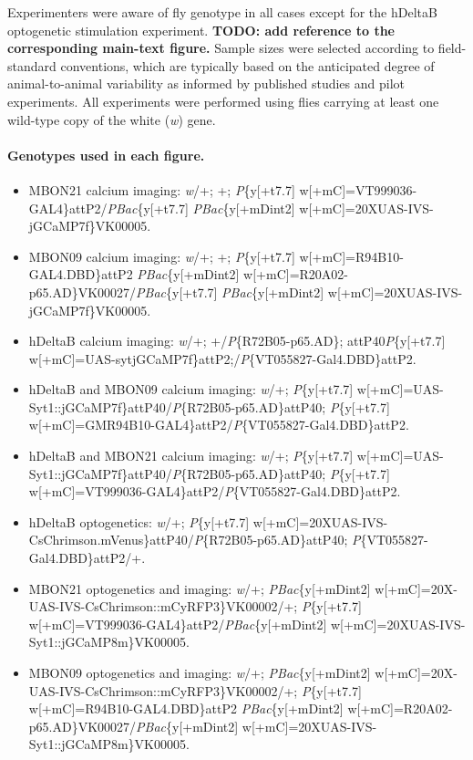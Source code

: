 Experimenters were aware of fly genotype in all cases except for the hDeltaB optogenetic stimulation experiment. \textbf{TODO: add reference to the corresponding main-text figure.} Sample sizes were selected according to field-standard conventions, which are typically based on the anticipated degree of animal-to-animal variability as informed by published studies and pilot experiments. All experiments were performed using flies carrying at least one wild-type copy of the white (\textit{w}) gene.

\paragraph{Genotypes used in each figure.}

{\raggedright
\begin{itemize}
    \item MBON21 calcium imaging: \textit{w}/+; +; \textit{P}\{y[+t7.7] w[+mC]=VT999036-GAL4\}attP2/\textit{PBac}\{y[+t7.7] \textit{PBac}\{y[+mDint2] w[+mC]=20XUAS-IVS-jGCaMP7f\}VK00005.
    \item MBON09 calcium imaging: \textit{w}/+; +; \textit{P}\{y[+t7.7] w[+mC]=R94B10-GAL4.DBD\}attP2 \textit{PBac}\{y[+mDint2] w[+mC]=R20A02-p65.AD\}VK00027/\textit{PBac}\{y[+t7.7] \textit{PBac}\{y[+mDint2] w[+mC]=20XUAS-IVS-jGCaMP7f\}VK00005.
    \item hDeltaB calcium imaging: \textit{w}/+; +/\textit{P}\{R72B05-p65.AD\}; attP40\textit{P}\{y[+t7.7] w[+mC]=UAS-sytjGCaMP7f\}attP2;/\textit{P}\{VT055827-Gal4.DBD\}attP2.
    \item hDeltaB and MBON09 calcium imaging: \textit{w}/+; \textit{P}\{y[+t7.7] w[+mC]=UAS-Syt1::jGCaMP7f\}attP40/\textit{P}\{R72B05-p65.AD\}attP40; \textit{P}\{y[+t7.7] w[+mC]=GMR94B10-GAL4\}attP2/\textit{P}\{VT055827-Gal4.DBD\}attP2.
    \item hDeltaB and MBON21 calcium imaging: \textit{w}/+; \textit{P}\{y[+t7.7] w[+mC]=UAS-Syt1::jGCaMP7f\}attP40/\textit{P}\{R72B05-p65.AD\}attP40; \textit{P}\{y[+t7.7] w[+mC]=VT999036-GAL4\}attP2/\textit{P}\{VT055827-Gal4.DBD\}attP2.
    \item hDeltaB optogenetics: \textit{w}/+; \textit{P}\{y[+t7.7] w[+mC]=20XUAS-IVS-CsChrimson.mVenus\}attP40/\textit{P}\{R72B05-p65.AD\}attP40; \textit{P}\{VT055827-Gal4.DBD\}attP2/+.
    \item MBON21 optogenetics and imaging: \textit{w}/+; \textit{PBac}\{y[+mDint2] w[+mC]=20X-UAS-IVS-CsChrimson::mCyRFP3\}VK00002/+; \textit{P}\{y[+t7.7] w[+mC]=VT999036-GAL4\}attP2/\textit{PBac}\{y[+mDint2] w[+mC]=20XUAS-IVS-Syt1::jGCaMP8m\}VK00005.
    \item MBON09 optogenetics and imaging: \textit{w}/+; \textit{PBac}\{y[+mDint2] w[+mC]=20X-UAS-IVS-CsChrimson::mCyRFP3\}VK00002/+; \textit{P}\{y[+t7.7] w[+mC]=R94B10-GAL4.DBD\}attP2 \textit{PBac}\{y[+mDint2] w[+mC]=R20A02-p65.AD\}VK00027/\textit{PBac}\{y[+mDint2] w[+mC]=20XUAS-IVS-Syt1::jGCaMP8m\}VK00005.
\end{itemize}
}

